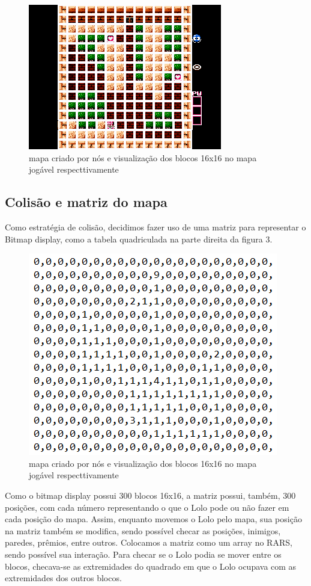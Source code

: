 \documentclass[10pt, conference, compsocconf]{IEEEtran}
\begin{document}
\begin{figure}[htb]
  \begin{center}
   \includegraphics[width=0.3\linewidth]{./Figures/image_6.png}
  \end{center}
  \caption{ mapa criado por nós e visualização dos
blocos 16x16 no mapa jogável respecttivamente}
  \label{fig:01}
\end{figure}


\subsection{Colisão e matriz do mapa}{
\label{sec:Mars}
Como estratégia de colisão, decidimos fazer uso de
uma matriz para representar o Bitmap display, como
a tabela quadriculada na parte direita da figura 3.

}

\begin{figure}[htb]
  \begin{center}
   \includegraphics[width=0.3\linewidth]{./Figures/image_7.png}
  \end{center}
  \caption{ mapa criado por nós e visualização dos
blocos 16x16 no mapa jogável respecttivamente}
  \label{fig:01}
\end{figure}

Como o bitmap display possui 300 blocos 16x16, a matriz possui, também, 300
posições, com cada número representando o que o Lolo pode ou não fazer em cada
posição do mapa. Assim, enquanto movemos o Lolo pelo mapa, sua posição na matriz
também se modifica, sendo possível checar as posições, inimigos, paredes,
prêmios, entre outros. Colocamos a matriz como um array no RARS, sendo possível
sua interação. Para checar se o Lolo podia se mover entre os blocos, checava-se
as extremidades do quadrado em que o Lolo ocupava com as extremidades dos outros
blocos.
\end{document}
